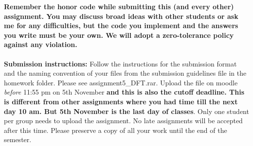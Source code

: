 \documentclass[11pt]{article}
\begin{document}
\maketitle

\textbf{Remember the honor code while submitting this (and every other) assignment. You may discuss broad ideas with other students or ask me for any difficulties, but the code you implement and the answers you write must be your own. We will adopt a \textbf{zero-tolerance policy} against any violation.}
\\
\\
\textbf{Submission instructions:} Follow the instructions for the submission format and the naming convention of your files from the submission guidelines file in the homework folder. Please see \textsf{assignment5\_DFT.rar}. Upload the file on moodle \emph{before} 11:55 pm on 5th November \textbf{and this is also the cutoff deadline. This is different from other assignments where you had time till the next day 10 am. But 5th November is the last day of classes}.  Only one student per group needs to upload the assignment. No late assignments will be accepted after this time. Please preserve a copy of all your work until the end of the semester.  
\end{document}
